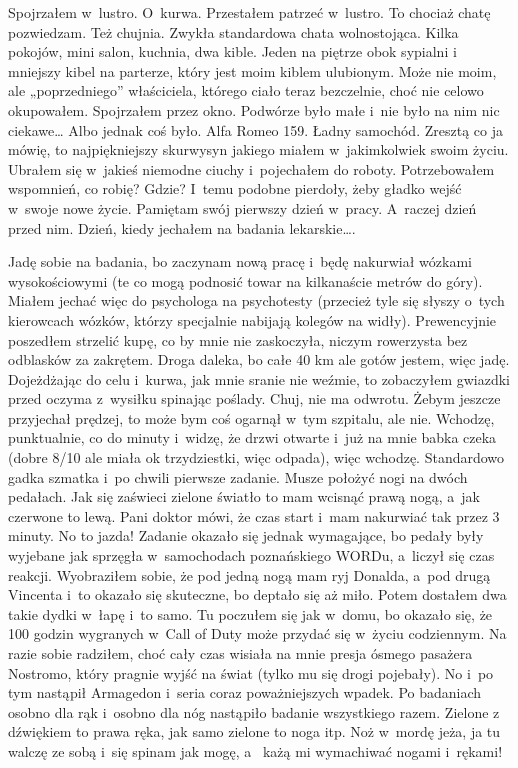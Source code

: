 Spojrzałem w~lustro. O~kurwa. Przestałem patrzeć w~lustro. To chociaż chatę pozwiedzam. Też chujnia. Zwykła 
standardowa chata wolnostojąca. Kilka pokojów, mini salon, kuchnia, dwa kible. Jeden na piętrze obok sypialni i~
mniejszy kibel na parterze, który jest moim kiblem ulubionym. Może nie moim, ale „poprzedniego” właściciela, którego 
ciało teraz bezczelnie, choć nie celowo okupowałem. Spojrzałem przez okno. Podwórze było małe i~nie było na nim nic 
ciekawe… Albo jednak coś było. Alfa Romeo 159. Ładny samochód. Zresztą co ja mówię, to najpiękniejszy skurwysyn 
jakiego miałem w~jakimkolwiek swoim życiu. Ubrałem się w~jakieś niemodne ciuchy i~pojechałem do roboty. Potrzebowałem 
wspomnień, co robię? Gdzie? I~temu podobne pierdoły, żeby gładko wejść w~swoje nowe życie. Pamiętam swój pierwszy 
dzień w~pracy. A~raczej dzień przed nim. Dzień, kiedy jechałem na badania lekarskie….

Jadę sobie na badania, bo zaczynam nową pracę i~będę nakurwiał wózkami wysokościowymi (te co mogą podnosić towar na 
kilkanaście metrów do góry). Miałem jechać więc do psychologa na psychotesty (przecież tyle się słyszy o~tych 
kierowcach wózków, którzy specjalnie nabijają kolegów na widły). Prewencyjnie poszedłem strzelić kupę, co by mnie nie 
zaskoczyła, niczym rowerzysta bez odblasków za zakrętem. Droga daleka, bo całe 40 km ale gotów jestem, więc jadę. 
Dojeżdżając do celu i~kurwa, jak mnie sranie nie weźmie, to zobaczyłem gwiazdki przed oczyma z~wysiłku spinając 
poślady. Chuj, nie ma odwrotu. Żebym jeszcze przyjechał prędzej, to może bym coś ogarnął w~tym szpitalu, ale nie. 
Wchodzę, punktualnie, co do minuty i~widzę, że drzwi otwarte i~już na mnie babka czeka (dobre 8/10 ale miała ok 
trzydziestki, więc odpada), więc wchodzę. Standardowo gadka szmatka i~po chwili pierwsze zadanie. Musze położyć nogi 
na dwóch pedałach. Jak się zaświeci zielone światło to mam wcisnąć prawą nogą, a~jak czerwone to lewą. Pani doktor 
mówi, że czas start i~mam nakurwiać tak przez 3 minuty. No to jazda! Zadanie okazało się jednak wymagające, bo pedały 
były wyjebane jak sprzęgła w~samochodach poznańskiego WORDu, a~liczył się czas reakcji. Wyobraziłem sobie, że pod 
jedną nogą mam ryj Donalda, a~pod drugą Vincenta i~to okazało się skuteczne, bo deptało się aż miło. Potem dostałem 
dwa takie dydki w~łapę i~to samo. Tu poczułem się jak w~domu, bo okazało się, że 100 godzin wygranych w~Call of Duty 
może przydać się w~życiu codziennym. Na razie sobie radziłem, choć cały czas wisiała na mnie presja ósmego pasażera 
Nostromo, który pragnie wyjść na świat (tylko mu się drogi pojebały). No i~po tym nastąpił Armagedon i~seria coraz 
poważniejszych wpadek. Po badaniach osobno dla rąk i~osobno dla nóg nastąpiło badanie wszystkiego razem. Zielone z~
dźwiękiem to prawa ręka, jak samo zielone to noga itp. Noż w~mordę jeża, ja tu walczę ze sobą i~się spinam jak mogę, a
~każą mi wymachiwać nogami i~rękami! 

